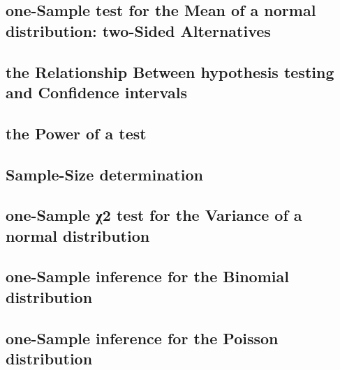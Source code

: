 \documentclass[12pt,]{article}
\begin{document}
\hypertarget{one-sample-test-for-the-mean-of-a-normal-distribution-two-sided-alternatives}{%
\subsection{one-Sample test for the Mean of a normal distribution:
two-Sided
Alternatives}\label{one-sample-test-for-the-mean-of-a-normal-distribution-two-sided-alternatives}}

\hypertarget{the-relationship-between-hypothesis-testing-and-confidence-intervals}{%
\subsection{the Relationship Between hypothesis testing and Confidence
intervals}\label{the-relationship-between-hypothesis-testing-and-confidence-intervals}}

\hypertarget{the-power-of-a-test}{%
\subsection{the Power of a test}\label{the-power-of-a-test}}

\hypertarget{sample-size-determination}{%
\subsection{Sample-Size determination}\label{sample-size-determination}}

\hypertarget{one-sample-2-test-for-the-variance-of-a-normal-distribution}{%
\subsection{one-Sample χ2 test for the Variance of a normal
distribution}\label{one-sample-2-test-for-the-variance-of-a-normal-distribution}}

\hypertarget{one-sample-inference-for-the-binomial-distribution}{%
\subsection{one-Sample inference for the Binomial
distribution}\label{one-sample-inference-for-the-binomial-distribution}}

\hypertarget{one-sample-inference-for-the-poisson-distribution}{%
\subsection{one-Sample inference for the Poisson
distribution}\label{one-sample-inference-for-the-poisson-distribution}}
\end{document}
